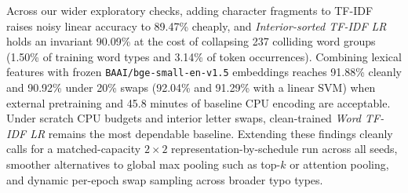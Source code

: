 Across our wider exploratory checks, adding character fragments to TF-IDF raises noisy linear accuracy to 89.47\% cheaply, and \textit{Interior-sorted TF-IDF LR} holds an invariant 90.09\% at the cost of collapsing 237 colliding word groups (1.50\% of training word types and 3.14\% of token occurrences). Combining lexical features with frozen \texttt{BAAI/bge-small-en-v1.5} embeddings reaches 91.88\% cleanly and 90.92\% under 20\% swaps (92.04\% and 91.29\% with a linear SVM) when external pretraining and 45.8 minutes of baseline CPU encoding are acceptable. Under scratch CPU budgets and interior letter swaps, clean-trained \textit{Word TF-IDF LR} remains the most dependable baseline. Extending these findings cleanly calls for a matched-capacity $2 \times 2$ representation-by-schedule run across all seeds, smoother alternatives to global max pooling such as top-$k$ or attention pooling, and dynamic per-epoch swap sampling across broader typo types.
